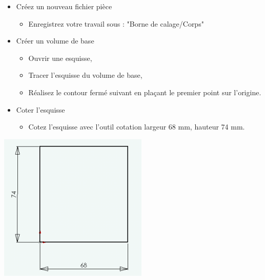 \begin{minipage}{0.75\linewidth}
\begin{itemize}
 \item Créez un nouveau fichier pièce
  \begin{itemize}
  \item Enregistrez votre travail sous : "Borne de calage/Corps"
  \end{itemize}
 \item Créer un volume de base
  \begin{itemize}
  \item Ouvrir une esquisse,
  \item Tracer l'esquisse du volume de base,
  \item Réalisez le contour fermé suivant en plaçant le premier point sur l'origine.
  \end{itemize} 
 \item Coter l'esquisse
  \begin{itemize}
  \item Cotez l'esquisse avec l'outil cotation largeur 68 mm, hauteur 74 mm.
  \end{itemize}
\end{itemize}
\end{minipage}
\hfill
\begin{minipage}{0.23\linewidth}
\includegraphics[width=0.9\linewidth]{img/002_5}
\end{minipage}

